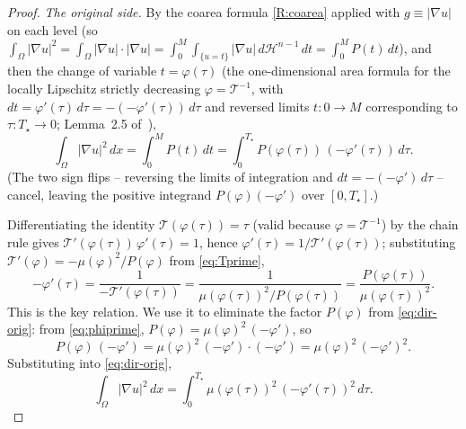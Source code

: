 \documentclass[11pt]{amsart}
\theoremstyle{definition}
\newcommand{\Om}{\Omega}
\newcommand{\abs}[1]{\left|#1\right|}
\newcommand{\dx}{\,dx}
\newcommand{\dt}{\,dt}
\newcommand{\dH}{\,d\mathcal H^{n-1}}
\begin{document}
\begin{proof}
\emph{The original side.} By the coarea formula \ref{R:coarea} applied with
$g\equiv\abs{\nabla u}$ on each level (so $\int_\Om\abs{\nabla u}^2
=\int_\Om\abs{\nabla u}\cdot\abs{\nabla u}=\int_0^M\int_{\{u=t\}}
\abs{\nabla u}\dH\,dt=\int_0^M P(t)\,dt$), and then the change of variable
$t=\varphi(\tau)$ (the one-dimensional area formula for the locally
Lipschitz strictly decreasing $\varphi=\mathcal T^{-1}$, with $dt=\varphi'(
\tau)\,d\tau=-(-\varphi'(\tau))\,d\tau$ and reversed limits $t:0\to M$
corresponding to $\tau:T_\star\to0$; Lemma~2.5 of~\cite{Brasco2014}),
\begin{equation}\label{eq:dir-orig}
  \int_\Om\abs{\nabla u}^2\dx
  =\int_0^M P(t)\dt
  =\int_0^{T_\star}P(\varphi(\tau))\,(-\varphi'(\tau))\,d\tau .
\end{equation}
(The two sign flips -- reversing the limits of integration and
$dt=-(-\varphi')\,d\tau$ -- cancel, leaving the positive integrand
$P(\varphi)(-\varphi')$ over $[0,T_\star]$.)

Differentiating the identity $\mathcal T(\varphi(\tau))=\tau$ (valid because
$\varphi=\mathcal T^{-1}$) by the chain rule gives
$\mathcal T'(\varphi(\tau))\,\varphi'(\tau)=1$, hence
$\varphi'(\tau)=1/\mathcal T'(\varphi(\tau))$; substituting
$\mathcal T'(\varphi)=-\mu(\varphi)^2/P(\varphi)$ from \eqref{eq:Tprime},
\begin{equation}\label{eq:phiprime}
  -\varphi'(\tau)=\frac{1}{-\mathcal T'(\varphi(\tau))}
  =\frac{1}{\mu(\varphi(\tau))^2/P(\varphi(\tau))}
  =\frac{P(\varphi(\tau))}{\mu(\varphi(\tau))^2}.
\end{equation}
This is the key relation. We use it to eliminate the factor
$P(\varphi)$ from \eqref{eq:dir-orig}: from \eqref{eq:phiprime},
$P(\varphi)=\mu(\varphi)^2\,(-\varphi')$, so
\[
  P(\varphi)\,(-\varphi')
  =\mu(\varphi)^2\,(-\varphi')\cdot(-\varphi')
  =\mu(\varphi)^2\,(-\varphi')^2 .
\]
Substituting into \eqref{eq:dir-orig},
\begin{equation}\label{eq:dir-orig2}
  \int_\Om\abs{\nabla u}^2\dx
  =\int_0^{T_\star}\mu(\varphi(\tau))^2\,(-\varphi'(\tau))^2\,d\tau.
\end{equation}


\end{proof}
\end{document}
